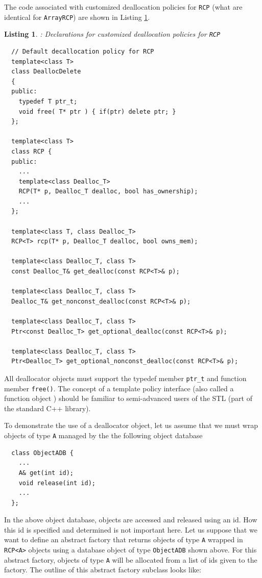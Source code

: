 \documentclass[pdf,ps2pdf,11pt]{SANDreport}
\newtheorem{listing}{Listing}
\begin{document}
The code associated with customized deallocation policies for
{}\texttt{RCP} (what are identical for {}\texttt{ArrayRCP}) are shown
in Listing {}\ref{listing:RCP-dealloc}.

\begin{listing}: Declarations for customized deallocation policies
for {}\texttt{RCP} \\
\label{listing:RCP-dealloc}
{\small\begin{verbatim}
  // Default decallocation policy for RCP
  template<class T>
  class DeallocDelete
  {
  public:
    typedef T ptr_t;
    void free( T* ptr ) { if(ptr) delete ptr; }
  };

  template<class T>
  class RCP {
  public:
    ...
    template<class Dealloc_T>
    RCP(T* p, Dealloc_T dealloc, bool has_ownership);
    ...
  };
  
  template<class T, class Dealloc_T>
  RCP<T> rcp(T* p, Dealloc_T dealloc, bool owns_mem);
  
  template<class Dealloc_T, class T>
  const Dealloc_T& get_dealloc(const RCP<T>& p);
  
  template<class Dealloc_T, class T>
  Dealloc_T& get_nonconst_dealloc(const RCP<T>& p);
  
  template<class Dealloc_T, class T>
  Ptr<const Dealloc_T> get_optional_dealloc(const RCP<T>& p);
  
  template<class Dealloc_T, class T> 
  Ptr<Dealloc_T> get_optional_nonconst_dealloc(const RCP<T>& p);

\end{verbatim}}
\end{listing}

All deallocator objects must support the typedef member
{}\texttt{ptr\_t} and function member {}\texttt{free()}.  The concept
of a template policy interface (also called a function object
\cite[Section 18.4]{stroustrup97}) should be familiar to
semi-advanced users of the STL (part of the standard C++ library).

To demonstrate the use of a deallocator object, let us assume that we
must wrap objects of type {}\texttt{A} managed by the the following
object database

{\small\begin{verbatim}
  class ObjectADB {
    ...
    A& get(int id);
    void release(int id);
    ...
  };
\end{verbatim}}

In the above object database, objects are accessed and released using
an id.  How this id is specified and determined is not important here.
Let us suppose that we want to define an abstract factory that returns
objects of type {}\texttt{A} wrapped in {}\texttt{RCP<A>} objects
using a database object of type {}\texttt{ObjectADB} shown above.  For
this abstract factory, objects of type {}\texttt{A} will be allocated
from a list of ids given to the factory.  The outline of this abstract
factory subclass looks like:
\end{document}
